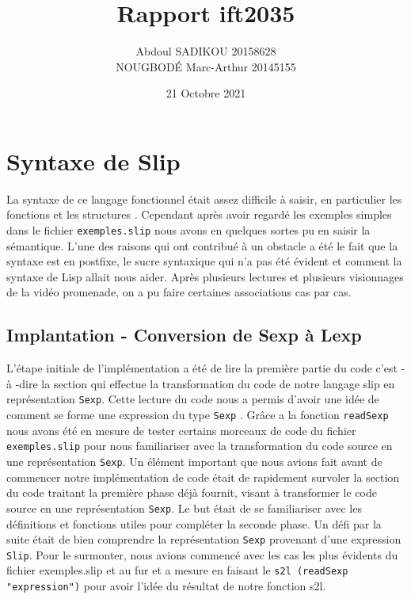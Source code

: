 \documentclass[10pt, titlepage]{article}
\title{Rapport ift2035}
\author{Abdoul SADIKOU 20158628\\
        NOUGBODÉ Marc-Arthur 20145155}
\date{21 Octobre 2021}
\begin{document}
\maketitle

\setcounter{page}{2}

\newpage

\section{Syntaxe de Slip}

La syntaxe de ce langage fonctionnel était assez difficile à saisir, en particulier les fonctions et les structures . Cependant après avoir regardé les exemples simples dans le fichier \texttt{exemples.slip} nous avons en quelques sortes pu en saisir la sémantique. L'une des raisons qui ont contribué à un obstacle a été le fait que la syntaxe est en postfixe, le sucre syntaxique qui n'a pas été évident et comment la syntaxe de Lisp allait nous aider. Après plusieurs lectures et plusieurs visionnages de la vidéo promenade, on a pu faire certaines associations cas par cas.

\subsection{Implantation - Conversion de Sexp à Lexp}

L'étape initiale de l'implémentation a été de lire la première partie du code c'est - à -dire la section qui effectue la transformation du code de notre langage slip en représentation \texttt{Sexp}. Cette lecture du code nous a permis d'avoir une idée de comment se forme une expression du type \texttt{Sexp} . Grâce a la fonction \texttt{readSexp} nous avons été en mesure de tester certains morceaux de code du fichier \texttt{exemples.slip} pour nous familiariser avec la transformation du code source en une représentation \texttt{Sexp}.
Un élément important que nous avions fait avant de commencer notre
implémentation de code était de rapidement survoler la section du code traitant
la première phase déjà fournit, visant à transformer le code source en une
représentation \texttt{Sexp}. Le but était de se familiariser avec les
définitions et fonctions utiles pour compléter la seconde phase. Un
défi par la suite était de bien comprendre la représentation \texttt{Sexp}
provenant d'une expression \texttt{Slip}. Pour le surmonter, nous avions
commencé avec les cas les plus évidents du fichier exemples.slip et au fur et a mesure en faisant le \texttt{s2l (readSexp "expression")} pour avoir l'idée du résultat de notre fonction s2l.\\
\end{document}
